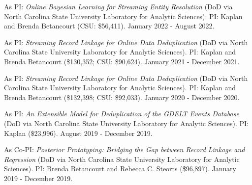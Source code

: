 \documentclass[margin,line]{res}
\begin{document}
\begin{resume}
As PI: {\em Online Bayesian Learning for Streaming Entity Resolution} (DoD via North Carolina State University Laboratory for Analytic Sciences). PI: Kaplan and Brenda Betancourt (CSU: \$56,411). January 2022 - August 2022.

As PI: {\em Streaming Record Linkage for Online Data Deduplication} (DoD via North Carolina State University Laboratory for Analytic Sciences). PI: Kaplan and Brenda Betancourt (\$130,352; CSU: \$90,624). January 2021 - December 2021.

As PI: {\em Streaming Record Linkage for Online Data Deduplication} (DoD via North Carolina State University Laboratory for Analytic Sciences). PI: Kaplan and Brenda Betancourt (\$132,398; CSU: \$92,033). January 2020 - December 2020.

As PI: {\em An Extensible Model for Deduplication of the GDELT Events Database} (DoD via North Carolina State University Laboratory for Analytic Sciences). PI: Kaplan (\$23,996). August 2019 - December 2019.

As Co-PI: {\em Posterior Prototyping: Bridging the Gap between Record Linkage and Regression} (DoD via North Carolina State University Laboratory for Analytic Sciences). PI: Brenda Betancourt and Rebecca C. Steorts (\$96,897). January 2019 - December 2019.

% 
% 
% 
% 
% 


\end{resume}
\end{document}
